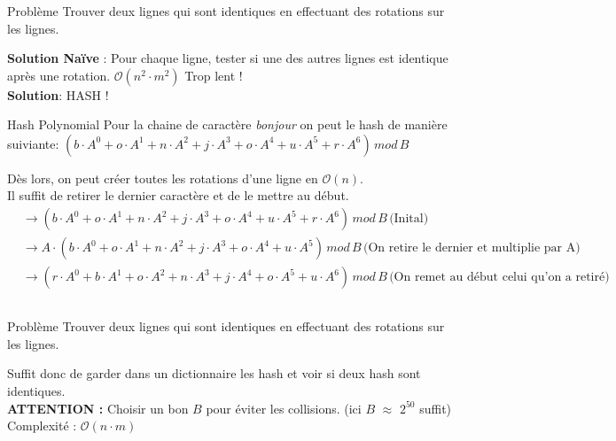 \begin{frame}
    \frametitle{\problemtitle}
        \begin{block}
            {Problème} Trouver deux lignes qui sont identiques en effectuant des rotations sur les lignes.
        \end{block}
        \pause
        \textbf{Solution Naïve} : Pour chaque ligne, tester si une des autres lignes est identique après une rotation. $\mathcal O(n^2 \cdot m^2)$ Trop lent !\\
        \pause
        \textbf{Solution}: HASH !
        \begin{block} {Hash Polynomial}
            Pour la chaine de caractère \textit{bonjour} on peut le hash de manière suiviante:
            $(b \cdot A^0 + o \cdot A^1 + n \cdot A^2 + j \cdot A^3 + o \cdot A^4 + u \cdot A^5 + r \cdot A^6) \, mod \, B$
        \end{block}
        \pause
        Dès lors, on peut créer toutes les rotations d'une ligne en $\mathcal O(n)$.\\
        Il suffit de retirer le dernier caractère et de le mettre au début.
        \pause
        \begin{align*}
           &\rightarrow (b \cdot A^0 + o \cdot A^1 + n \cdot A^2 + j \cdot A^3 + o \cdot A^4 + u \cdot A^5 + r \cdot A^6) \, mod \, B \,\text{(Inital)}\\
           &\rightarrow A \cdot (b \cdot A^0 + o \cdot A^1 + n \cdot A^2 + j \cdot A^3 + o \cdot A^4 + u \cdot A^5) \, mod \, B\, \text{(On retire le dernier et multiplie par A)}\\
           &\rightarrow (r \cdot A^0 + b \cdot A^1 + o \cdot A^2 + n \cdot A^3 + j \cdot A^4 + o \cdot A^5 + u \cdot A^6) \, mod \, B\, \text{(On remet au début celui qu'on a retiré)}\\
        \end{align*}
        \pause
\end{frame}
\begin{frame}
    \frametitle{\problemtitle}
        \begin{block}
            {Problème} Trouver deux lignes qui sont identiques en effectuant des rotations sur les lignes.
        \end{block}
    Suffit donc de garder dans un dictionnaire les hash et voir si deux hash sont identiques.\\
    \textbf{ATTENTION :} Choisir un bon $B$ pour éviter les collisions. (ici $B$ $\approx$ $2^{50}$ suffit)\\
    \pause
    Complexité : $\mathcal O(n \cdot m)$
\end{frame}
